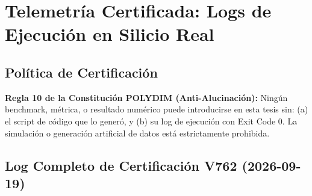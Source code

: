 \chapter{Telemetría Certificada: Logs de Ejecución en Silicio Real}
\label{ap:telemetria}

\section*{Política de Certificación}

\begin{criticalbox}
\textbf{Regla 10 de la Constitución POLYDIM (Anti-Alucinación):}
Ningún benchmark, métrica, o resultado numérico puede introducirse en esta tesis sin:
(a) el script de código que lo generó, y
(b) su log de ejecución con Exit Code 0.
La simulación o generación artificial de datos está estrictamente prohibida.
\end{criticalbox}

\section{Log Completo de Certificación V762 (2026-09-19)}


